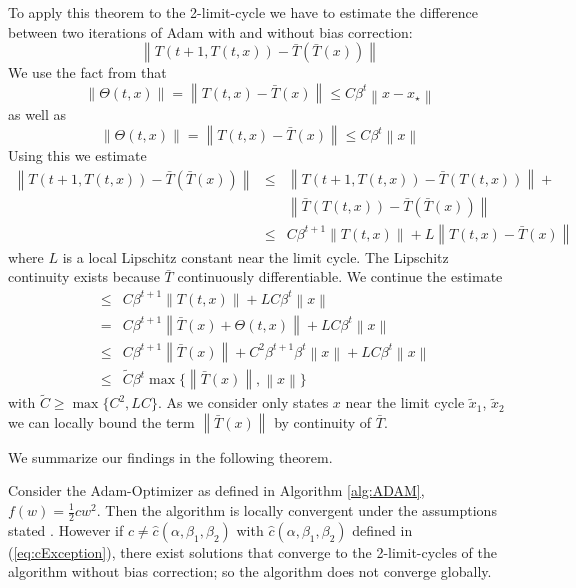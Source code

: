 \documentclass[runningheads]{llncs}
\def\weight{w}
\def\xstar{x_\star}
\def\refb#1{(\ref{#1})}
\newcommand{\norm}[1]{\left\lVert#1\right\rVert}
\begin{document}
To apply this theorem to the 2-limit-cycle we have to estimate the difference 
between two iterations of Adam with and without bias correction:
\[
	\norm{T(t+1,T(t,x))- \bar T(\bar T(x))}
\]
We use the fact from \cite{BockWeiss.2019} that 
\[
  \norm {\Theta(t,x)} = 
  \norm {T(t,x)- \bar T(x)} 
  \leq
  C \beta^t \norm {x-\xstar}
\]
as well as %
\[
  \norm {\Theta(t,x)} = 
  \norm {T(t,x)- \bar T(x)} 
  \leq
  C \beta^t \norm {x}
\]
Using this we estimate
\begin{eqnarray*}
  \norm {T(t+1,T(t,x))- \bar T(\bar T(x))}
  	&\leq&
  	\norm {T(t+1,T(t,x))- \bar T(T(t,x))}
  	+
  	\\
  	& & 
  	\norm {\bar T(T(t,x))- \bar T(\bar T(x))}
  	\\
  	&\leq&
  	C \beta^{t+1} \norm{T(t,x)} + L \norm {T(t,x)- \bar T(x)}
\end{eqnarray*}
where $L$ is a local Lipschitz constant near the limit cycle. The Lipschitz continuity exists because $\bar T$ continuously differentiable. We continue the estimate
\begin{eqnarray*}
  	&\leq&
 	C \beta^{t+1} \norm{T(t,x)} + L C \beta^t \norm {x}
 	\\
 	&=&
 	C \beta^{t+1} \norm{\bar T (x) + \Theta(t,x)} + L C \beta^t \norm {x}
 	\\
 	&\leq&
 	C \beta^{t+1} \norm{\bar T (x)} 
 	+ C^2 \beta^{t+1} \beta^{t} \norm{x} + L C \beta^t \norm {x}
 	\\
 	&\leq&
 	\tilde{C} \beta^t \max\{\norm{\bar T (x)}, \norm {x}\}
\end{eqnarray*}
with $\tilde{C} \geq \max\{C^2, LC\}$. As we consider only states $x$ near the limit cycle $\tilde x_1$, $\tilde x_2$
we can locally bound the term $\norm{\bar T (x)}$ by continuity of $\bar T$.

We summarize our findings in the following theorem.
\begin{theorem}
Consider the Adam-Optimizer as defined in Algorithm \ref{alg:ADAM}, 
$f(\weight) = \frac 1 2 c\weight^2$. Then the algorithm
is locally convergent under the assumptions stated \cite{BockWeiss.2019}. 
However if $c\neq \hat c(\alpha, \beta_1, \beta_2)$ with $\hat c(\alpha, \beta_1, \beta_2)$ 
defined in \refb{eq:cException}, there exist solutions that converge to the
2-limit-cycles of the algorithm without bias correction; so 
the algorithm does not converge globally.
\end{theorem}
\end{document}
